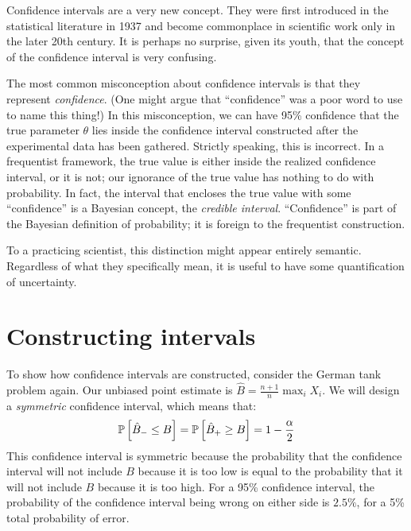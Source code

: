 Confidence intervals are a very new concept. They were first introduced in the statistical literature in 1937 and become commonplace in scientific work only in the later 20th century.
It is perhaps no surprise, given its youth, that the concept of the confidence interval
is very confusing.

The most common misconception about confidence intervals is that they represent
\emph{confidence}. (One might argue that ``confidence'' was a poor word to use to name this
thing!) In this misconception, we can have 95\% confidence that the true parameter $\theta$
lies inside the confidence interval constructed after the experimental data has been gathered.
Strictly speaking, this is incorrect. In a frequentist framework, the true
value is either inside the realized confidence interval, or it is not; our ignorance of
the true value has nothing to do with probability. In fact, the interval that encloses
the true value with some ``confidence'' is a Bayesian concept, the \emph{credible interval}.
``Confidence'' is part of the Bayesian definition of probability; it is foreign to the
frequentist construction.

To a practicing scientist, this distinction might appear entirely semantic. Regardless of
what they specifically mean, it is useful to have some quantification of uncertainty.

\section{Constructing intervals}

To show how confidence intervals are constructed, consider the German
tank problem again. Our unbiased point estimate is $\hat{B} = \tfrac{n+1}{n} \max_i X_i$.
We will design a \emph{symmetric} confidence interval, which means that:
\begin{equation*}
    \mathbb{P}\left[{\hat{B}_- \leq B}\right] = \mathbb{P}\left[{\hat{B}_+ \geq B}\right] = 1 - \frac{\alpha}{2}
\end{equation*}
This confidence interval is symmetric because the probability that the confidence interval
will not include $B$ because it is too low is equal to the probability that it will not
include $B$ because it is too high. For a 95\% confidence interval, the probability of the
confidence interval being wrong on either side is $2.5\%$, for a 5\% total probability of
error.

